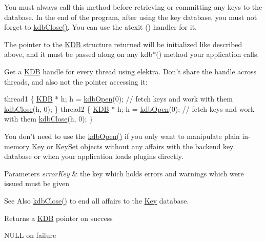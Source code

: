 You must always call this method before retrieving or committing any keys to the database. In the end of the program, after using the key database, you must not forget to \hyperlink{group__kdb_gadb54dc9fda17ee07deb9444df745c96f}{kdb\-Close()}. You can use the atexit () handler for it.

The pointer to the {\ttfamily \hyperlink{classkdb_1_1KDB}{K\-D\-B}} structure returned will be initialized like described above, and it must be passed along on any kdb$\ast$() method your application calls.

Get a {\ttfamily \hyperlink{classkdb_1_1KDB}{K\-D\-B}} handle for every thread using elektra. Don't share the handle across threads, and also not the pointer accessing it\-: 
\begin{DoxyCode}
thread1
\{
        \hyperlink{classkdb_1_1KDB_a7e0637995ce9f294cdbc6f167df6db40}{KDB} * h;
        h = \hyperlink{group__kdb_ga6808defe5870f328dd17910aacbdc6ca}{kdbOpen}(0);
        \textcolor{comment}{// fetch keys and work with them}
        \hyperlink{group__kdb_gadb54dc9fda17ee07deb9444df745c96f}{kdbClose}(h, 0);
\}
thread2
\{
        \hyperlink{classkdb_1_1KDB_a7e0637995ce9f294cdbc6f167df6db40}{KDB} * h;
        h = \hyperlink{group__kdb_ga6808defe5870f328dd17910aacbdc6ca}{kdbOpen}(0);
        \textcolor{comment}{// fetch keys and work with them}
        \hyperlink{group__kdb_gadb54dc9fda17ee07deb9444df745c96f}{kdbClose}(h, 0);
\}
\end{DoxyCode}


You don't need to use the \hyperlink{group__kdb_ga6808defe5870f328dd17910aacbdc6ca}{kdb\-Open()} if you only want to manipulate plain in-\/memory \hyperlink{classkdb_1_1Key}{Key} or \hyperlink{classkdb_1_1KeySet}{Key\-Set} objects without any affairs with the backend key database or when your application loads plugins directly.


\begin{DoxyParams}{Parameters}
{\em error\-Key} & the key which holds errors and warnings which were issued must be given \\
\hline
\end{DoxyParams}
\begin{DoxySeeAlso}{See Also}
\hyperlink{group__kdb_gadb54dc9fda17ee07deb9444df745c96f}{kdb\-Close()} to end all affairs to the \hyperlink{group__key}{Key} database. 
\end{DoxySeeAlso}
\begin{DoxyReturn}{Returns}
a \hyperlink{classkdb_1_1KDB}{K\-D\-B} pointer on success 

N\-U\-L\-L on failure 
\end{DoxyReturn}
 

